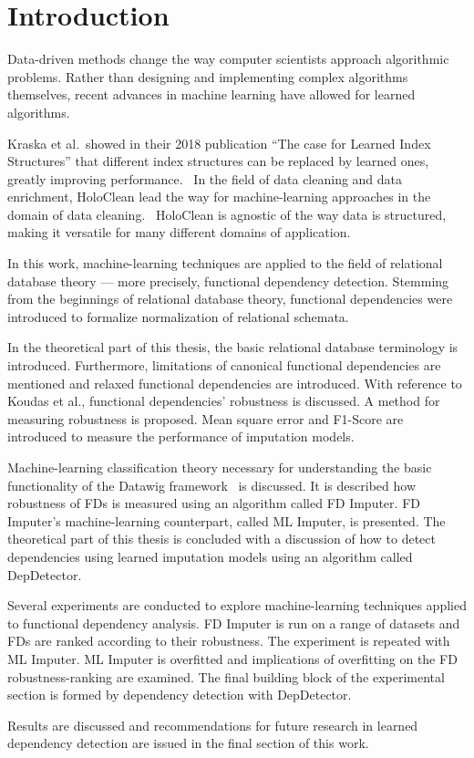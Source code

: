 \section{Introduction}
Data-driven methods change the way computer scientists approach algorithmic problems.
Rather than designing and implementing complex algorithms themselves, recent advances in machine learning have allowed for learned algorithms.

Kraska et al.\ showed in their 2018 publication ``The case for Learned Index Structures'' that different index structures can be replaced by learned ones, greatly improving performance.~\cite{KRA18}
In the field of data cleaning and data enrichment, HoloClean lead the way for machine-learning approaches in the domain of data cleaning.~\cite{HEI19}
HoloClean is agnostic of the way data is structured, making it versatile for many different domains of application.

In this work, machine-learning techniques are applied to the field of relational database theory --- more precisely, functional dependency detection.
Stemming from the beginnings of relational database theory, functional dependencies were introduced to formalize normalization of relational schemata.

In the theoretical part of this thesis, the basic relational database terminology is introduced.
Furthermore, limitations of canonical functional dependencies are mentioned and relaxed functional dependencies are introduced.
With reference to Koudas et al., functional dependencies' robustness is discussed.
A method for measuring robustness is proposed.
Mean square error and F1-Score are introduced to measure the performance of imputation models.

Machine-learning classification theory necessary for understanding the basic functionality of the Datawig framework~\cite{BIE18} is discussed.
It is described how robustness of FDs is measured using an algorithm called FD Imputer.
FD Imputer's machine-learning counterpart, called ML Imputer, is presented.
The theoretical part of this thesis is concluded with a discussion of how to detect dependencies using learned imputation models using an algorithm called DepDetector.

Several experiments are conducted to explore machine-learning techniques applied to functional dependency analysis.
FD Imputer is run on a range of datasets and FDs are ranked according to their robustness.
The experiment is repeated with ML Imputer.
ML Imputer is overfitted and implications of overfitting on the FD robustness-ranking are examined.
The final building block of the experimental section is formed by dependency detection with DepDetector.

Results are discussed and recommendations for future research in learned dependency detection are issued in the final section of this work.
